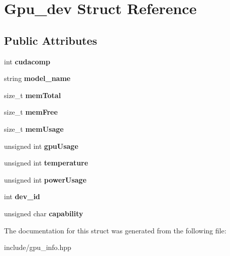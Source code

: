 \hypertarget{structGpu__dev}{}\section{Gpu\+\_\+dev Struct Reference}
\label{structGpu__dev}
\subsection*{Public Attributes}
\begin{DoxyCompactItemize}
\item 
\mbox{\label{structGpu__dev_a7085492618ef94a529204b2ff556721a}} 
int {\bfseries cudacomp}
\item 
\mbox{\label{structGpu__dev_a7f0cef2d2eb0a7445089d583bdf6bb9a}} 
string {\bfseries model\+\_\+name}
\item 
\mbox{\label{structGpu__dev_a2d179e639ddb426b260e98ab4cef1b12}} 
size\+\_\+t {\bfseries mem\+Total}
\item 
\mbox{\label{structGpu__dev_a496b992ec613779e1ae477746590062c}} 
size\+\_\+t {\bfseries mem\+Free}
\item 
\mbox{\label{structGpu__dev_af8bdd9733e7764475ef326bd18458b03}} 
size\+\_\+t {\bfseries mem\+Usage}
\item 
\mbox{\label{structGpu__dev_afd30893f956062f2374c1a351b3aac46}} 
unsigned int {\bfseries gpu\+Usage}
\item 
\mbox{\label{structGpu__dev_a67b1af46495105d2ba36bcdd50163c94}} 
unsigned int {\bfseries temperature}
\item 
\mbox{\label{structGpu__dev_af959a60696ab5c1c938b73d1ef3bd1e9}} 
unsigned int {\bfseries power\+Usage}
\item 
\mbox{\label{structGpu__dev_a68da341018f9033bf459bcb26a5f8130}} 
int {\bfseries dev\+\_\+id}
\item 
\mbox{\label{structGpu__dev_aea661199c6c4947867f400ee0998a474}} 
unsigned char {\bfseries capability}
\end{DoxyCompactItemize}


The documentation for this struct was generated from the following file\+:\begin{DoxyCompactItemize}
\item 
include/gpu\+\_\+info.\+hpp\end{DoxyCompactItemize}
